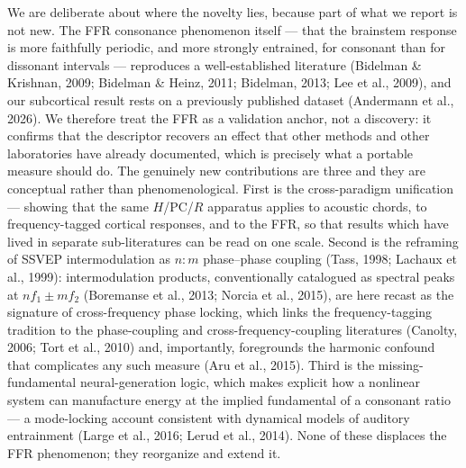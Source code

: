 \documentclass[11pt]{article}
\begin{document}
We are deliberate about where the novelty lies, because part of what we report is not new. The FFR consonance phenomenon itself --- that the brainstem response is more faithfully periodic, and more strongly entrained, for consonant than for dissonant intervals --- reproduces a well-established literature (Bidelman \& Krishnan, 2009; Bidelman \& Heinz, 2011; Bidelman, 2013; Lee et al., 2009), and our subcortical result rests on a previously published dataset (Andermann et al., 2026). We therefore treat the FFR as a validation anchor, not a discovery: it confirms that the descriptor recovers an effect that other methods and other laboratories have already documented, which is precisely what a portable measure should do. The genuinely new contributions are three and they are conceptual rather than phenomenological. First is the cross-paradigm unification --- showing that the same $H$/$\mathrm{PC}$/$R$ apparatus applies to acoustic chords, to frequency-tagged cortical responses, and to the FFR, so that results which have lived in separate sub-literatures can be read on one scale. Second is the reframing of SSVEP intermodulation as $n{:}m$ phase--phase coupling (Tass, 1998; Lachaux et al., 1999): intermodulation products, conventionally catalogued as spectral peaks at $n f_1 \pm m f_2$ (Boremanse et al., 2013; Norcia et al., 2015), are here recast as the signature of cross-frequency phase locking, which links the frequency-tagging tradition to the phase-coupling and cross-frequency-coupling literatures (Canolty, 2006; Tort et al., 2010) and, importantly, foregrounds the harmonic confound that complicates any such measure (Aru et al., 2015). Third is the missing-fundamental neural-generation logic, which makes explicit how a nonlinear system can manufacture energy at the implied fundamental of a consonant ratio --- a mode-locking account consistent with dynamical models of auditory entrainment (Large et al., 2016; Lerud et al., 2014). None of these displaces the FFR phenomenon; they reorganize and extend it.
\end{document}
